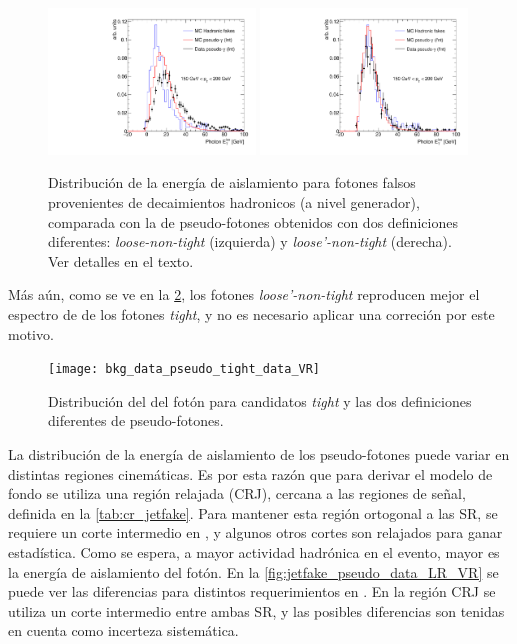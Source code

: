 \begin{figure}[!htb]
  \centering

  \includegraphics[width=0.49\textwidth]{figures/bkg_mc_pseudo_data_SR_l_ptbin}
  \includegraphics[width=0.49\textwidth]{figures/bkg_mc_pseudo_data_SR_lp_ptbin}

  \caption{Distribución de la energía de aislamiento para fotones falsos
    provenientes de decaimientos hadronicos (a nivel generador), comparada con
    la de pseudo-fotones obtenidos con dos definiciones diferentes: \emph{loose-non-tight} (izquierda)
    y \emph{loose'-non-tight} (derecha). Ver detalles en el texto.}
  \label{fig:jetfake_mc_data}

\end{figure}

Más aún, como se ve en la \cref{fig:jetfake_pseudo_data_pt}, los fotones \emph{loose'-non-tight}
reproducen mejor el espectro de {\pt} de los fotones \emph{tight}, y no es necesario
aplicar una correción por este motivo.

\begin{figure}[!htb]
  \centering

  \texttt{[image: bkg\_data\_pseudo\_tight\_data\_VR]}

  \caption{Distribución del {\pt} del fotón para candidatos
    \emph{tight} y las dos definiciones diferentes de pseudo-fotones.}
  \label{fig:jetfake_pseudo_data_pt}

\end{figure}


La distribución de la energía de aislamiento de los pseudo-fotones puede variar
en distintas regiones cinemáticas. Es por esta razón que para derivar el modelo
de fondo se utiliza una región relajada (CRJ), cercana a las regiones de señal, definida en
la \cref{tab:cr_jetfake}. Para mantener esta región ortogonal a las SR, se
requiere un corte intermedio en {\met}, y algunos otros cortes son relajados
para ganar estadística. Como se espera, a mayor actividad hadrónica en el
evento, mayor es la energía de aislamiento del fotón. En la
\cref{fig:jetfake_pseudo_data_LR_VR} se puede ver las diferencias para distintos
requerimientos en {\HT}. En la región CRJ se utiliza un corte intermedio entre
ambas SR, y las posibles diferencias son tenidas en cuenta como incerteza
sistemática.


